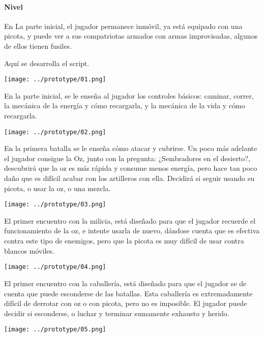   \paragraph{Nivel}

  En La parte inicial, el jugador permanece inmóvil, ya está equipado con una picota, y puede ver a sus compatriotas armados con armas improvisadas, algunos de ellos tienen fusiles.

  Aquí se desarrolla el script.
  \begin{center}
    \texttt{[image: ../prototype/01.png]}
  \end{center}

  En la parte inicial, se le enseña al jugador los controles básicos: caminar, correr, la mecánica de la energía y cómo recargarla, y la mecánica de la vida y cómo recargarla.
  \begin{center}
    \texttt{[image: ../prototype/02.png]}
  \end{center}


  En la primera batalla se le enseña cómo atacar y cubrirse. Un poco más adelante el jugador consigue la Oz, junto con la pregunta: ¿Sembradores en el desierto?, descubrirá que la oz es más rápida y consume menos energía, pero hace tan poco daño que es difícil acabar con los artilleros con ella. Decidirá si seguir usando su picota, o usar la oz, o una mezcla.
  \begin{center}
    \texttt{[image: ../prototype/03.png]}
  \end{center}

  El primer encuentro con la milicia, está diseñado para que el jugador recuerde el funcionamiento de la oz, e intente usarla de nuevo, dándose cuenta que es efectiva contra este tipo de enemigos, pero que la picota es muy difícil de usar contra blancos móviles.
  \begin{center}
    \texttt{[image: ../prototype/04.png]}
  \end{center}

  
  El primer encuentro con la caballería, está diseñado para que el jugador se de cuenta que puede esconderse de las batallas. Esta caballería es extremadamente difícil de derrotar con oz o con picota, pero no es imposible. El jugador puede decidir si esconderse, o luchar y terminar sumamente exhausto y herido.

  \begin{center}
    \texttt{[image: ../prototype/05.png]}
  \end{center}

